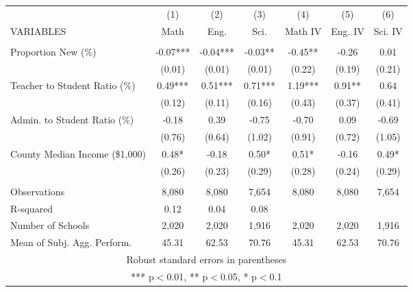 \begin{tabular}{lcccccc}
\hline\hline 
 & (1) & (2) & (3) & (4) & (5) & (6) \\
VARIABLES & Math  & Eng.  & Sci.  & Math IV & Eng. IV & Sci. IV \\ \hline
 &  &  &  &  &  &  \\
Proportion New (\%) & -0.07*** & -0.04*** & -0.03** & -0.45** & -0.26 & 0.01 \\
 & (0.01) & (0.01) & (0.01) & (0.22) & (0.19) & (0.21) \\
Teacher to Student Ratio (\%) & 0.49*** & 0.51*** & 0.71*** & 1.19*** & 0.91** & 0.64 \\
 & (0.12) & (0.11) & (0.16) & (0.43) & (0.37) & (0.41) \\
Admin. to Student Ratio (\%) & -0.18 & 0.39 & -0.75 & -0.70 & 0.09 & -0.69 \\
 & (0.76) & (0.64) & (1.02) & (0.91) & (0.72) & (1.05) \\
County Median Income (\$1,000) & 0.48* & -0.18 & 0.50* & 0.51* & -0.16 & 0.49* \\
 & (0.26) & (0.23) & (0.29) & (0.28) & (0.24) & (0.29) \\
 &  &  &  &  &  &  \\
Observations & 8,080 & 8,080 & 7,654 & 8,080 & 8,080 & 7,654 \\
R-squared & 0.12 & 0.04 & 0.08 &  &  &  \\
 Number of Schools & 2,020 & 2,020 & 1,916 & 2,020 & 2,020 & 1,916 \\
 Mean of Subj. Agg. Perform. & 45.31 & 62.53 & 70.76& 45.31 & 62.53 & 70.76\\
 \hline\hline
\multicolumn{7}{c}{ Robust standard errors in parentheses} \\
\multicolumn{7}{c}{ *** p$<$0.01, ** p$<$0.05, * p$<$0.1} \\
\end{tabular}



